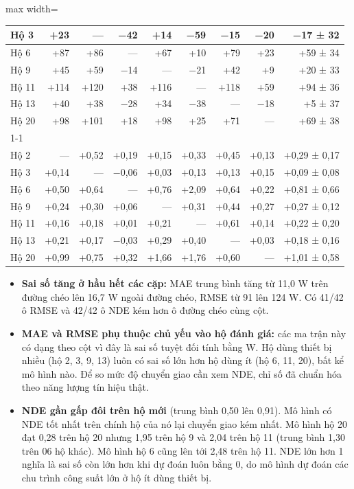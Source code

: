 \begin{table}[H]
\begin{adjustbox}{max width=\linewidth}
\begin{tabular}{|l|r|r|r|r|r|r|r|r|}
Hộ 3 & +23 & — & −42 & +14 & −59 & −15 & −20 & −17 ± 32 \\ \hline
Hộ 6 & +87 & +86 & — & +67 & +10 & +79 & +23 & +59 ± 34 \\ \hline
Hộ 9 & +45 & +59 & −14 & — & −21 & +42 & +9 & +20 ± 33 \\ \hline
Hộ 11 & +114 & +120 & +38 & +116 & — & +118 & +59 & +94 ± 36 \\ \hline
Hộ 13 & +40 & +38 & −28 & +34 & −38 & — & −18 & +5 ± 37 \\ \hline
Hộ 20 & +98 & +101 & +18 & +98 & +25 & +71 & — & +69 ± 38 \\ \cline{1-1}
\multicolumn{9}{|l|}{\textbf{NDE ↓}} \\ \hline
Hộ 2 & — & +0,52 & +0,19 & +0,15 & +0,33 & +0,45 & +0,13 & +0,29 ± 0,17 \\ \hline
Hộ 3 & +0,14 & — & −0,06 & +0,03 & +0,13 & +0,13 & +0,15 & +0,09 ± 0,08 \\ \hline
Hộ 6 & +0,50 & +0,64 & — & +0,76 & +2,09 & +0,64 & +0,22 & +0,81 ± 0,66 \\ \hline
Hộ 9 & +0,24 & +0,30 & +0,06 & — & +0,31 & +0,44 & +0,27 & +0,27 ± 0,12 \\ \hline
Hộ 11 & +0,16 & +0,18 & +0,01 & +0,21 & — & +0,61 & +0,14 & +0,22 ± 0,20 \\ \hline
Hộ 13 & +0,21 & +0,17 & −0,03 & +0,29 & +0,40 & — & +0,03 & +0,18 ± 0,16 \\ \hline
Hộ 20 & +0,99 & +0,75 & +0,32 & +1,66 & +1,76 & +0,60 & — & +1,01 ± 0,58 \\ \hline
\end{tabular}
\end{adjustbox}
\end{table}

\begin{itemize}
\item \textbf{Sai số tăng ở hầu hết các cặp:} MAE trung bình tăng từ 11,0 W trên đường chéo lên 16,7 W ngoài đường chéo, RMSE từ 91 lên 124 W. Có 41/42 ô RMSE và 42/42 ô NDE kém hơn ô đường chéo cùng cột.
\item \textbf{MAE và RMSE phụ thuộc chủ yếu vào hộ đánh giá:} các ma trận này có dạng theo cột vì đây là sai số tuyệt đối tính bằng W. Hộ dùng thiết bị nhiều (hộ 2, 3, 9, 13) luôn có sai số lớn hơn hộ dùng ít (hộ 6, 11, 20), bất kể mô hình nào. Để so mức độ chuyển giao cần xem NDE, chỉ số đã chuẩn hóa theo năng lượng tín hiệu thật.
\item \textbf{NDE gần gấp đôi trên hộ mới} (trung bình 0,50 lên 0,91). Mô hình có NDE tốt nhất trên chính hộ của nó lại chuyển giao kém nhất. Mô hình hộ 20 đạt 0,28 trên hộ 20 nhưng 1,95 trên hộ 9 và 2,04 trên hộ 11 (trung bình 1,30 trên 06 hộ khác). Mô hình hộ 6 cũng lên tới 2,48 trên hộ 11. NDE lớn hơn 1 nghĩa là sai số còn lớn hơn khi dự đoán luôn bằng 0, do mô hình dự đoán các chu trình công suất lớn ở hộ ít dùng thiết bị.
\end{itemize}

